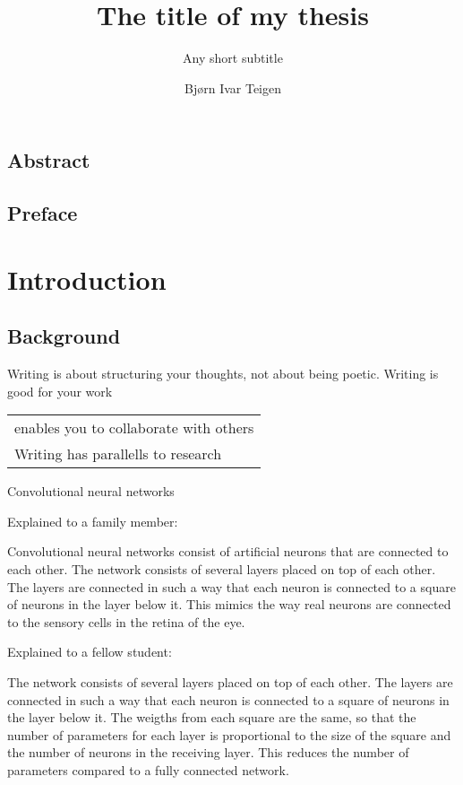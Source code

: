 \documentclass[UKenglish]{ifimaster}  %
\title{The title of my thesis}        %
\subtitle{Any short subtitle}         %
\author{Bjørn Ivar Teigen}                      %
\begin{document}
\duoforside[dept={Department of Informatics},   %
  program={Robotics and intelligent systems},  %
  long]                                        %

\frontmatter{}

\chapter*{Abstract}                   %

\tableofcontents{}
\listoffigures{}
\listoftables{}

\chapter*{Preface}                    %

\mainmatter{}
\part{Introduction}                   %

\chapter{Background}                  %
Writing is about structuring your thoughts, not about being poetic.
Writing is good for your work

\begin{tabular}{l}
  enables you to collaborate with others \\
  Writing has parallells to research
\end{tabular}

Convolutional neural networks

Explained to a family member:

Convolutional neural networks consist of artificial neurons that are connected to each other.
The network consists of several layers placed on top of each other. The layers are connected in such a way that each neuron is
connected to a square of neurons in the layer below it. This mimics the way real neurons are connected to the sensory cells in the retina of the eye.

Explained to a fellow student:

The network consists of several layers placed on top of each other. The layers are connected in such a way that each neuron is
connected to a square of neurons in the layer below it. The weigths from each square are the same, so that the number of parameters
for each layer is proportional to the size of the square and the number of neurons in the receiving layer. This reduces the number of
parameters compared to a fully connected network.
\end{document}
